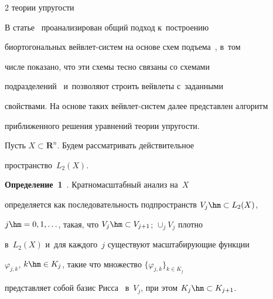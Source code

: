 \begin{multicols}{2}
{теории упругости}





\vspace*{-2pt}





  В статье~\cite{7-bos} проанализирован общий подход к~по\-стро\-ению 


би\-ор\-то\-го\-наль\-ных вейв\-лет-сис\-тем на основе схем подъема~\cite{5-bos}, в~том 


чис\-ле показано, что эти схемы тесно связаны со схемами  


подразделений~\cite{4-bos} и~поз\-во\-ля\-ют строить вейвлеты с~заданными 


свойствами. На основе таких вейв\-лет-сис\-тем далее представлен алгоритм 


при\-бли\-жен\-но\-го решения уравнений тео\-рии упругости.


  


  Пусть $X\subset \mathbf{R}^n$. Будем рассматривать действительное 


пространство~$L_2(X)$.








\smallskip





\noindent


\textbf{Определение~1}~\cite{5-bos}. Кратномасштабный анализ на~$X$ 


определяется как последовательность подпространств $V_j\hm\subset L_2(X)$, 


$j\hm= 0,1,\ldots$, такая, что $V_j\hm\subset V_{j+1}$; $\cup_j V_j$ плотно 


в~$L_2(X)$ и~для каж\-до\-го~$j$ существуют масштабирующие функции 


$\varphi_{j,k}$, $k\hm\in K_j$, такие что множество $\{\varphi_{j,k}\}_{k\in K_j}$ 


пред\-став\-ля\-ет собой базис Рисса~\cite{8-bos} в~$V_j$, при этом $K_j\hm\subset 


K_{j+1}$.








\smallskip






\end{multicols}
